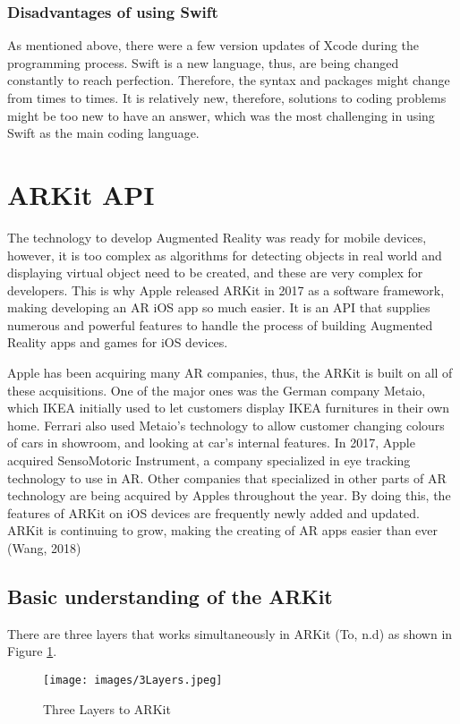 	\subsubsection{Disadvantages of using Swift}
As mentioned above, there were a few version updates of Xcode during the programming process. Swift is a new language, thus, are being changed constantly to reach perfection. Therefore, the syntax and packages might change from times to times. It is relatively new, therefore, solutions to coding problems might be too new to have an answer, which was the most challenging in using Swift as the main coding language. 

\section{ARKit API}
The technology to develop Augmented Reality was ready for mobile devices, however, it is too complex as algorithms for detecting objects in real world and displaying virtual object need to be created, and these are very complex for developers. This is why Apple released ARKit in 2017 as a software framework, making developing an AR iOS app so much easier. It is an API that supplies numerous and powerful features to handle the process of building Augmented Reality apps and games for iOS devices. 

Apple has been acquiring many AR companies, thus, the ARKit is built on all of these acquisitions. One of the major ones was the German company Metaio, which IKEA initially used to let customers display IKEA furnitures in their own home. Ferrari also used Metaio’s technology to allow customer changing colours of cars in showroom, and looking at car’s internal features. In 2017, Apple acquired SensoMotoric Instrument, a company specialized in eye tracking technology to use in AR. Other companies that specialized in other parts of AR technology are being acquired by Apples throughout the year. By doing this, the features of ARKit on iOS devices are frequently newly added and updated. ARKit is continuing to grow, making the creating of AR apps easier than ever (Wang, 2018)

\subsection{Basic understanding of the ARKit}
There are three layers that works simultaneously in ARKit (To, n.d) as shown in Figure \ref{fig:3Layers}.
\begin{figure}[!htp]
	\centering
	\texttt{[image: images/3Layers.jpeg]}
	\caption{Three Layers to ARKit}
	\label{fig:3Layers}
\end{figure}

